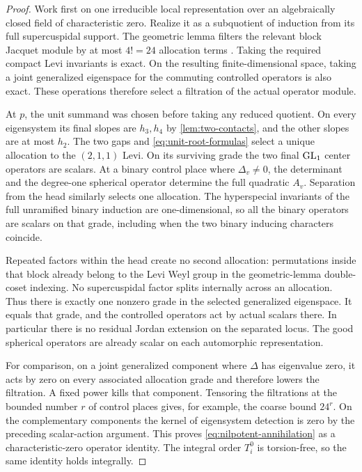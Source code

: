 \begin{proof}
Work first on one irreducible local representation over an
algebraically closed field of characteristic zero.  Realize it as a
subquotient of induction from its full supercuspidal support.  The
geometric lemma filters the relevant block Jacquet module by at most
$4!=24$ allocation terms
\citep[Lemma 2.12]{BernsteinZelevinsky1977}.
Taking the required compact Levi invariants is exact.  On the
resulting finite-dimensional space, taking a joint generalized
eigenspace for the commuting controlled operators is also exact.
These operations therefore select a filtration of the actual
operator module.

At $p$, the unit summand was chosen before taking any reduced
quotient.  On every eigensystem its final slopes are $h_3,h_4$ by
\cref{lem:two-contacts}, and the other slopes are at most $h_2$.
The two gaps and \cref{eq:unit-root-formulas} select a unique
allocation to the $(2,1,1)$ Levi.  On its surviving grade the two
final $\operatorname{GL}_1$ center operators are scalars.  At a binary control
place where $\Delta_v\ne0$, the determinant and the degree-one
spherical operator determine the full quadratic $A_v$.  Separation
from the head similarly selects one allocation.  The hyperspecial
invariants of the full unramified binary induction are
one-dimensional, so all the binary operators are scalars on that
grade, including when the two binary inducing characters coincide.

Repeated factors within the head create no second allocation:
permutations inside that block already belong to the Levi Weyl group
in the geometric-lemma double-coset indexing.  No supercuspidal
factor splits internally across an allocation.  Thus there is
exactly one nonzero grade in the selected generalized eigenspace.
It equals that grade, and the controlled operators act by actual
scalars there.  In particular there is no residual Jordan extension
on the separated locus.  The good spherical operators are already
scalar on each automorphic representation.

For comparison, on a joint generalized component where $\Delta$
has eigenvalue zero, it acts by zero on every associated allocation
grade and therefore lowers the filtration.  A fixed power kills
that component.  Tensoring the filtrations at the bounded number
$r$ of control places gives, for example, the coarse bound $24^r$.
On the complementary components the kernel of eigensystem detection
is zero by the preceding scalar-action argument.  This proves
\cref{eq:nilpotent-annihilation} as a characteristic-zero operator
identity.  The integral order $T_i^0$ is torsion-free, so the same
identity holds integrally.


\end{proof}
